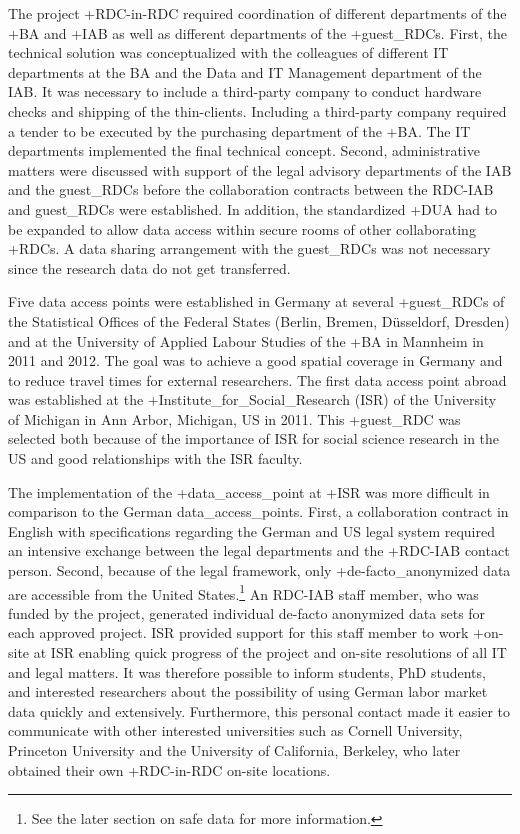\documentclass[
]{book}
\begin{document}
The project +RDC-in-RDC\textbar{} required coordination of different departments of the +BA\textbar{} and +IAB\textbar{} as well as different departments of the +guest\_RDC\textbar s. First, the technical solution was conceptualized with the colleagues of different IT departments at the BA and the Data and IT Management department of the IAB. It was necessary to include a third-party company to conduct hardware checks and shipping of the thin-clients. Including a third-party company required a tender to be executed by the purchasing department of the +BA\textbar. The IT departments implemented the final technical concept. Second, administrative matters were discussed with support of the legal advisory departments of the IAB and the guest\_RDCs before the collaboration contracts between the RDC-IAB and guest\_RDCs were established. In addition, the standardized +DUA\textbar{} had to be expanded to allow data access within secure rooms of other collaborating +RDC\textbar s. A data sharing arrangement with the guest\_RDCs was not necessary since the research data do not get transferred.

Five data access points were established in Germany at several +guest\_RDC\textbar s of the Statistical Offices of the Federal States (Berlin, Bremen, Düsseldorf, Dresden) and at the University of Applied Labour Studies of the +BA\textbar{} in Mannheim in 2011 and 2012. The goal was to achieve a good spatial coverage in Germany and to reduce travel times for external researchers. The first data access point abroad was established at the +Institute\_for\_Social\_Research\textbar{} (ISR) of the University of Michigan in Ann Arbor, Michigan, US in 2011. This +guest\_RDC\textbar{} was selected both because of the importance of ISR for social science research in the US and good relationships with the ISR faculty.

The implementation of the +data\_access\_point\textbar{} at +ISR\textbar{} was more difficult in comparison to the German data\_access\_points. First, a collaboration contract in English with specifications regarding the German and US legal system required an intensive exchange between the legal departments and the +RDC-IAB\textbar{} contact person. Second, because of the legal framework, only +de-facto\_anonymized\textbar{} data are accessible from the United States.\footnote{See the later section on safe data for more information.} An RDC-IAB staff member, who was funded by the project, generated individual de-facto anonymized data sets for each approved project. ISR provided support for this staff member to work +on-site\textbar{} at ISR enabling quick progress of the project and on-site resolutions of all IT and legal matters. It was therefore possible to inform students, PhD students, and interested researchers about the possibility of using German labor market data quickly and extensively. Furthermore, this personal contact made it easier to communicate with other interested universities such as Cornell University, Princeton University and the University of California, Berkeley, who later obtained their own +RDC-in-RDC\textbar{} on-site locations.
\end{document}
